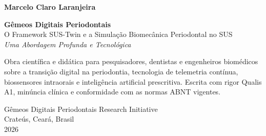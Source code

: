 \begin{folhaderosto}
    \centering
    
    {\large\bfseries Marcelo Claro Laranjeira}\par
    
    \vspace{2cm}
    
    {\Huge\bfseries\color{codeblue} Gêmeos Digitais Periodontais}\\[0.3cm]
    {\large O Framework SUS-Twin e a Simulação Biomecânica Periodontal no SUS}\\[0.6cm]
    {\large\itshape Uma Abordagem Profunda e Tecnológica}\par
    
    \vspace{1.5cm}
    
    \hfill
    \begin{minipage}{0.45\textwidth}
    \small
    Obra científica e didática para pesquisadores, dentistas 
    e engenheiros biomédicos sobre a transição digital na periodontia, 
    tecnologia de telemetria contínua, biossensores intraorais e 
    inteligência artificial prescritiva. Escrita com rigor 
    Qualis A1, minúncia clínica e conformidade com as normas 
    ABNT vigentes.
    \end{minipage}
    \par
    
    \vspace{1.5cm}
    
    \begin{flushright}
    {\small Gêmeos Digitais Periodontais Research Initiative}\\[0.1cm]
    {\small Crateús, Ceará, Brasil}\\[0.1cm]
    {\small 2026}
    \end{flushright}
    
    \vspace*{\fill}
\end{folhaderosto}

